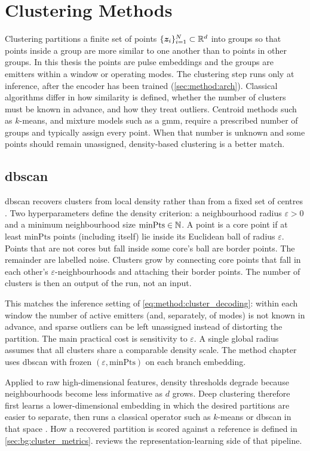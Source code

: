 \section{Clustering Methods}\label{sec:bg:clustering}

Clustering partitions a finite set of points \(\{\bm{z}_i\}_{i=1}^{N} \subset \mathbb{R}^{d}\) into groups so that points inside a group are more similar to one another than to points in other groups.
In this thesis the points are pulse embeddings and the groups are emitters within a window or operating modes.
The clustering step runs only at inference, after the encoder has been trained (\cref{sec:method:arch}).
Classical algorithms differ in how similarity is defined, whether the number of clusters must be known in advance, and how they treat outliers.
Centroid methods such as \(k\)-means, and mixture models such as a \gls{gmm}, require a prescribed number of groups and typically assign every point.
When that number is unknown and some points should remain unassigned, density-based clustering is a better match.

\subsection*{\Gls{dbscan}}

\Gls{dbscan} recovers clusters from local density rather than from a fixed set of centres \parencite{ester1996density}.
Two hyperparameters define the density criterion: a neighbourhood radius \(\varepsilon > 0\) and a minimum neighbourhood size \(\mathrm{minPts} \in \mathbb{N}\).
A point is a core point if at least \(\mathrm{minPts}\) points (including itself) lie inside its Euclidean ball of radius \(\varepsilon\).
Points that are not cores but fall inside some core's ball are border points.
The remainder are labelled noise.
Clusters grow by connecting core points that fall in each other's \(\varepsilon\)-neighbourhoods and attaching their border points.
The number of clusters is then an output of the run, not an input.

This matches the inference setting of \cref{eq:method:cluster_decoding}: within each window the number of active emitters (and, separately, of modes) is not known in advance, and sparse outliers can be left unassigned instead of distorting the partition.
The main practical cost is sensitivity to \(\varepsilon\).
A single global radius assumes that all clusters share a comparable density scale.
The method chapter uses \gls{dbscan} with frozen \((\varepsilon,\mathrm{minPts})\) on each branch embedding.

Applied to raw high-dimensional features, density thresholds degrade because neighbourhoods become less informative as \(d\) grows.
Deep clustering therefore first learns a lower-dimensional embedding in which the desired partitions are easier to separate, then runs a classical operator such as \(k\)-means or \gls{dbscan} in that space \parencite{xie2016unsupervised}.
How a recovered partition is scored against a reference is defined in \cref{sec:bg:cluster_metrics}.
 reviews the representation-learning side of that pipeline.
